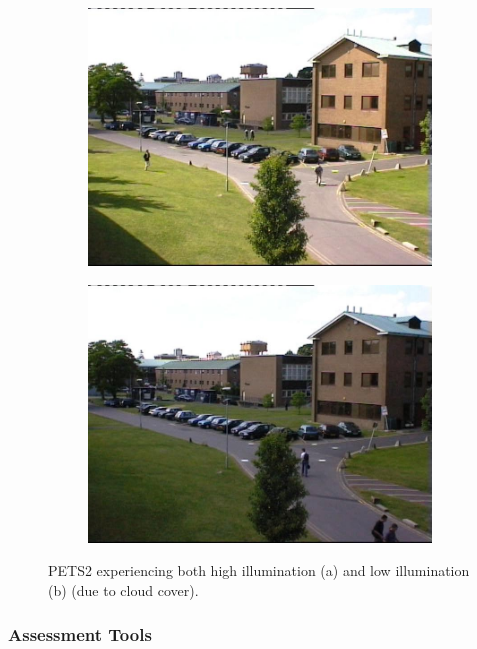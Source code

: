 \documentclass[12pt]{report}
\begin{document}
\begin{figure}
\centering
\begin{subfigure}{.48\linewidth}
 \includegraphics[width=1\linewidth]{figures/PETS2_highv.jpg}
  \caption{}
\end{subfigure}
\hfill
\begin{subfigure}{.48\linewidth}
 \includegraphics[width=1\linewidth]{figures/PETS2_lowv.jpg}
  \caption{}
\end{subfigure}
\caption{PETS2 experiencing both high illumination (a) and low illumination (b) (due to cloud cover).}
\label{fig:pets2illum}
\end{figure}

\subsubsection{Assessment Tools}
\end{document}
